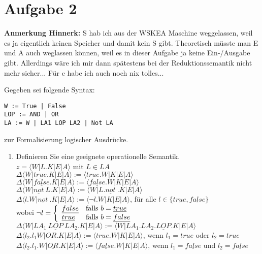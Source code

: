 \documentclass[ngerman,a4paper]{report}
\begin{document}
\section*{Aufgabe 2}
\textbf{Anmerkung Hinnerk:} S hab ich aus der WSKEA Maschine weggelassen, weil es ja eigentlich keinen Speicher und damit kein S gibt. Theoretisch müsste man E und A auch weglassen können, weil es in dieser Aufgabe ja keine Ein-/Ausgabe gibt. Allerdings wäre ich mir dann spätestens bei der Reduktionssemantik nicht mehr sicher...
Für c habe ich auch noch nix tolles...

Gegeben sei folgende Syntax:
\begin{lstlisting}
W := True | False
LOP := AND | OR
LA := W | LA1 LOP LA2 | Not LA
\end{lstlisting}
zur Formalisierung logischer Ausdrücke.
\begin{enumerate}
\item Definieren Sie eine geeignete operationelle Semantik.\\
$z=\langle W|L.K|E|A\rangle$ mit $L \in LA$\\

$\Delta\langle W|\underline{true}.K|E|A\rangle:= \langle \underline{true}.W|K|E|A\rangle$\\
$\Delta\langle W|\underline{false}.K|E|A\rangle:= \langle \underline{false}.W|K|E|A\rangle$\\
$\Delta\langle W|\underline{not}\  L.K|E|A\rangle:= \langle W|L.\underline{not}\ .K|E|A\rangle$\\
$\Delta\langle l.W|\underline{not}\ .K|E|A\rangle:= \langle \neg l.W|K|E|A\rangle$, für alle $l\in \{\underline{true},\underline{false}\}$\\
wobei $\neg l = \left\lbrace\begin{array}{l l}
\underline{false}& \text{falls } b=\underline{true}\\
\underline{true}& \text{falls } b=\underline{false}\\
\end{array}\right.$\\
$\Delta\langle W|LA_1\ \underline{LOP}\ LA_2.K|E|A\rangle:= \langle W|LA_1.LA_2.\underline{LOP}.K|E|A\rangle$\\
$\Delta\langle l_2.l_1W|\underline{OR}.K|E|A\rangle:= \langle \underline{true}.W|K|E|A\rangle$, wenn $l_1=\underline{true}$ oder $l_2=\underline{true}$\\
$\Delta\langle l_2.l_1.W|\underline{OR}.K|E|A\rangle:= \langle \underline{false}.W|K|E|A\rangle$, wenn $l_1=\underline{false}$ und $l_2=\underline{false}$\\


\end{enumerate}
\end{document}
